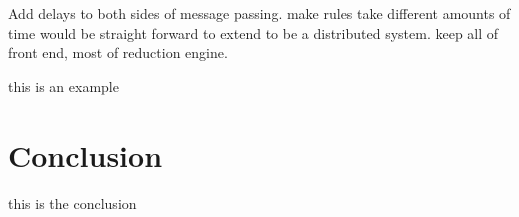 \documentclass{llncs}
\begin{document}
Add delays to both sides of message passing.
make rules take different amounts of time
would be straight forward to extend to be a distributed system. keep all of front end, most of reduction engine. 




\begin{example} 
this is an example
\end{example}


\section{Conclusion}
this is the conclusion



%

\newcommand\rrule[9] {
	\noindent \textbf{#1}
	\par
	\medskip
	\noindent
	\begin{tabular} {p{ 5mm} p{ 2mm} p{20mm} p{25mm} p{15mm} p{ 3mm} p{42mm}}
			& ( & #2, & \raggedleft{#3}, & \raggedleft{#4} & ) & #5\\
	$\Rightarrow$	& ( & #6, & \raggedleft{#7}, & \raggedleft{#8} & ) & #9
	\end{tabular}
	\\
}	


\newcommand\rruleCfSE[9] {
	\noindent \textbf{#1}
	\par
	\medskip
	\noindent
	\begin{tabular} {p{ 5mm} p{ 2mm} p{30mm} p{20mm} p{10mm} p{ 3mm} p{42mm}}
			& ( & #2, & \raggedleft{#3}, & \raggedleft{#4} & ) & #5\\
	$\Rightarrow$	& ( & #6, & \raggedleft{#7}, & \raggedleft{#8} & ) & #9
	\end{tabular}
	\\
}	


\newcommand\rruleCESfH[9] {
	\noindent \textbf{#1}
	\par
	\medskip
	\noindent
	\begin{tabular} {p{ 5mm} p{ 2mm} p{30mm} p{35mm} p{25mm} p{ 3mm} p{5mm}}
			& ( & #2, & \raggedleft{#3}, & \raggedleft{#4} & ) & #5\\
	$\Rightarrow$	& ( & #6, & \raggedleft{#7}, & \raggedleft{#8} & ) & #9
	\end{tabular}
	\\
}	


\newcommand\rruleCEfHS[9] {
	\noindent \textbf{#1}
	\par
	\medskip
	\noindent
	\begin{tabular} {p{ 5mm} p{ 2mm} p{30mm} p{50mm} p{10mm} p{ 3mm} p{5mm}}
			& ( & #2, & \raggedleft{#3}, & \raggedleft{#4} & ) & #5\\
	$\Rightarrow$	& ( & #6, & \raggedleft{#7}, & \raggedleft{#8} & ) & #9
	\end{tabular}
	\\
}	
\end{document}
